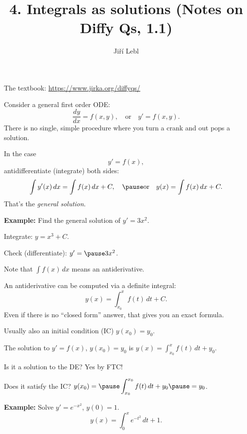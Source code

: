 \documentclass[10pt,aspectratio=169]{beamer}
\author{Ji\v{r}\'i Lebl}
\institute[OSU]{%
Oklahoma State University%
}
\title{4. Integrals as solutions (Notes on Diffy Qs, 1.1)}
\date{}
\begin{document}
\begin{frame}
\titlepage


\begin{center}
The textbook: \url{https://www.jirka.org/diffyqs/}
\end{center}
\end{frame}

\begin{frame}
Consider a general first order ODE:
\[
\frac{dy}{dx} = f(x,y) ,
\quad\text{or}\quad
y' = f(x,y) .
\]
\pause
There is no single, simple procedure where you turn a crank and out pops a
solution.

\medskip
\pause

In the case
\[
y' = f(x) ,
\]
\pause
antidifferentiate (integrate) both sides:
\[
\int y'(x) \,dx = \int f(x) \,dx + C ,
\quad\pause\text{or}\quad
y(x) = \int f(x) \,dx + C .
\]
\pause
That's the \emph{general solution}.

\medskip
\pause

\textbf{Example:}
Find the general solution of $y' = 3 x^2$.

\medskip
\pause

Integrate:\quad
$y = x^3 + C$.

\medskip
\pause

Check (differentiate):\quad
$y' = \pause 3x^2$.
\quad
{\Large\checkmark}
\end{frame}

\begin{frame}
Note that $\int f(x) \, dx$ means an antiderivative.

\medskip
\pause

An antiderivative can be computed via a definite integral:
\[
y(x) = \int_{x_0}^x f(t) \,dt + C .
\]
\pause
Even if there is no ``closed form'' answer, that gives you
an exact formula.

\medskip
\pause

Usually also an initial condition (IC) \quad $y(x_0) = y_0$.

\medskip
\pause

The solution to $y' = f(x)$, $y(x_0)=y_0$ is
\quad
$\displaystyle
y(x) = \int_{x_0}^x f(t) \,dt + y_0$.

\medskip
\pause

Is it a solution to the DE?
\pause
Yes by FTC!

\medskip
\pause

Does it satisfy the IC?
\quad
\pause
$\displaystyle y(x_0) = \pause \int_{x_0}^{x_0} f(t)\,dt + y_0 \pause = y_0$.
\quad
{\Large\checkmark}

\medskip
\pause

\textbf{Example:}
Solve
$y' = e^{-x^2}$, $y(0) = 1$.
\pause
\[
y(x) = \int_0^x e^{-t^2} \,dt + 1 .
\]
\end{frame}
\end{document}
